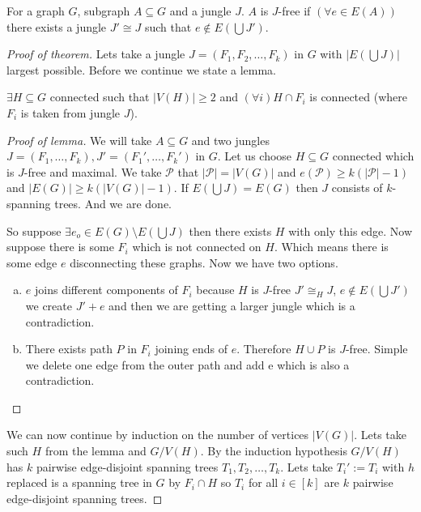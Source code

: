 \begin{defn}
	For a graph $G$, subgraph $A \subseteq G$ and a jungle $J$. $A$ is $J$-free if $(\forall e \in E(A))$ there exists a jungle $J' \cong J$ such that $e \notin E(\bigcup J')$. 
\end{defn}

\begin{proof} [Proof of theorem]
	Lets take a jungle $J = (F_{1}, F_{2}, \dots, F_{k})$ in $G$ with $|E (\bigcup J)|$ largest possible. Before we continue we state a lemma.
	
	\begin{lemma}
		$\exists H \subseteq G$ connected such that $|V(H)| \geq 2$ and $(\forall i) H \cap F_{i}$ is connected (where $F_{i}$ is taken from jungle $J$).
	\end{lemma}
	
	\begin{proof}[Proof of lemma]
		We will take $A \subseteq G$ and two jungles $J = (F_{1}, \dots, F_{k}), J' = (F_{1}', \dots, F_{k}')$ in $G$. Let us choose $H \subseteq G$ connected which is $J$-free and maximal. We take $\mathcal{P}$ that $|\mathcal{P}| = |V(G)|$ and $e(\mathcal{P}) \geq k(|\mathcal{P}| - 1)$ and $|E(G)| \geq k (|V(G)| -1)$. If $E(\bigcup J) = E(G)$ then $J$ consists of $k$-spanning trees. And we are done.
		
		So suppose $\exists e_{o} \in E(G) \setminus E(\bigcup J)$ then there exists $H$ with only this edge. Now suppose there is some $F_{i}$ which is not connected on $H$. Which means there is some edge $e$ disconnecting these graphs. Now we have two options.
		
		\begin{enumerate}[(a)]
			\item $e$ joins different components of $F_{i}$ because $H$ is $J$-free $J' \cong_{H} J$, $e \notin E(\bigcup J')$ we create $J' + e$ and then we are getting a larger jungle which is a contradiction.
			
			\item There exists path $P$ in $F_{i}$ joining ends of $e$. Therefore $H \cup P$ is $J$-free. Simple we delete one edge from the outer path and add e which is also a contradiction.
		\end{enumerate}
	\end{proof}
	
	We can now continue by induction on the number of vertices $|V(G)|$. Lets take such $H$ from the lemma and $G / V(H)$. By the induction hypothesis $G / V(H)$ has $k$ pairwise edge-disjoint spanning trees $T_{1}, T_{2}, \dots, T_{k}$. Lets take $T_{i}' := T_{i}$ with $h$ replaced is a spanning tree in $G$ by $F_{i} \cap H$ so $T_{i}$ for all $i \in [k]$ are $k$ pairwise edge-disjoint spanning trees.
	
\end{proof}